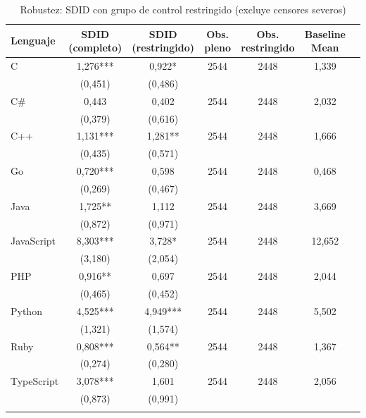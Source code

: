 \begin{table}[htbp]\centering
\caption{Robustez: SDID con grupo de control restringido (excluye censores severos)}
\label{tab:tabla5}
{\def\sym#1{\ifmmode^{#1}\else\(^{#1}\)\fi}
\begin{tabular}{lcccccc}
\toprule
Lenguaje & \shortstack{SDID \\ (completo)} & \shortstack{SDID \\ (restringido)} & Obs. pleno & Obs. restringido & \shortstack{Baseline \\ Mean} \\
\midrule
C & 1{,}276*** & 0{,}922* & 2544 & 2448 & 1{,}339 \\
              & (0{,}451) & (0{,}486) & & & \\
\addlinespace
C\# & 0{,}443 & 0{,}402 & 2544 & 2448 & 2{,}032 \\
              & (0{,}379) & (0{,}616) & & & \\
\addlinespace
C++ & 1{,}131*** & 1{,}281** & 2544 & 2448 & 1{,}666 \\
              & (0{,}435) & (0{,}571) & & & \\
\addlinespace
Go & 0{,}720*** & 0{,}598 & 2544 & 2448 & 0{,}468 \\
              & (0{,}269) & (0{,}467) & & & \\
\addlinespace
Java & 1{,}725** & 1{,}112 & 2544 & 2448 & 3{,}669 \\
              & (0{,}872) & (0{,}971) & & & \\
\addlinespace
JavaScript & 8{,}303*** & 3{,}728* & 2544 & 2448 & 12{,}652 \\
              & (3{,}180) & (2{,}054) & & & \\
\addlinespace
PHP & 0{,}916** & 0{,}697 & 2544 & 2448 & 2{,}044 \\
              & (0{,}465) & (0{,}452) & & & \\
\addlinespace
Python & 4{,}525*** & 4{,}949*** & 2544 & 2448 & 5{,}502 \\
              & (1{,}321) & (1{,}574) & & & \\
\addlinespace
Ruby & 0{,}808*** & 0{,}564** & 2544 & 2448 & 1{,}367 \\
              & (0{,}274) & (0{,}280) & & & \\
\addlinespace
TypeScript & 3{,}078*** & 1{,}601 & 2544 & 2448 & 2{,}056 \\
              & (0{,}873) & (0{,}991) & & & \\
\addlinespace
\bottomrule
\end{tabular}}

\end{table}
